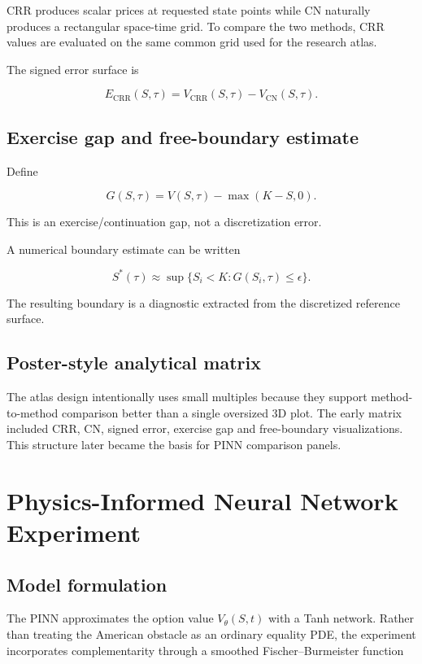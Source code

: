 \documentclass[11pt,a4paper]{article}
\begin{document}
CRR produces scalar prices at requested state points while CN naturally produces a rectangular space-time grid. To compare the two methods, CRR values are evaluated on the same common grid used for the research atlas.

The signed error surface is

\[
E_{\mathrm{CRR}}(S,\tau)=V_{\mathrm{CRR}}(S,\tau)-V_{\mathrm{CN}}(S,\tau).
\]

\subsection{Exercise gap and free-boundary estimate}

Define

\[
G(S,\tau)=V(S,\tau)-\max(K-S,0).
\]

This is an exercise/continuation gap, not a discretization error.

A numerical boundary estimate can be written

\[
S^*(\tau)\approx\sup\{S_i<K:G(S_i,\tau)\le\epsilon\}.
\]

The resulting boundary is a diagnostic extracted from the discretized reference surface.

\subsection{Poster-style analytical matrix}

The atlas design intentionally uses small multiples because they support method-to-method comparison better than a single oversized 3D plot. The early matrix included CRR, CN, signed error, exercise gap and free-boundary visualizations. This structure later became the basis for PINN comparison panels.

\section{Physics-Informed Neural Network Experiment}

\subsection{Model formulation}

The PINN approximates the option value \(V_\theta(S,t)\) with a Tanh network. Rather than treating the American obstacle as an ordinary equality PDE, the experiment incorporates complementarity through a smoothed Fischer--Burmeister function
\end{document}
